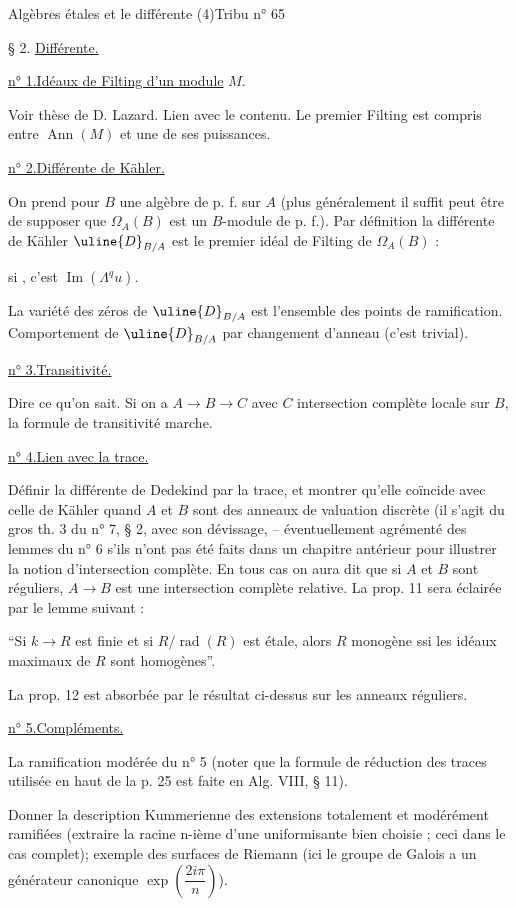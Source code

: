 
Algèbres étales et le différente (4)\hfill Tribu n° 65

§ 2. \uline{Différente.}

\uline{n° 1.}\quad \uline{Idéaux de Filting d'un module} $M$.

Voir thèse de D. Lazard. Lien avec le contenu. Le premier Filting est compris entre $\operatorname{Ann}(M)$ et une de ses puissances.

\uline{n° 2.}\quad \uline{Différente de Kähler.}

On prend pour $B$ une algèbre de \margin{\unsure{!}}p. f. sur $A$ (plus généralement il suffit peut être de supposer que $\Omega_A(B)$ est un $B$-module de p. f.). Par définition la différente de Kähler $\uline{D}_{B/A}$ est le premier idéal de Filting de $\Omega_A(B)$ :

si
, c'est $\operatorname{Im}(\Lambda^q u)$.

La variété des zéros de $\uline{D}_{B/A}$ est l'ensemble des points de ramification. Comportement de $\uline{D}_{B/A}$ par changement d'anneau (c'est trivial).

\uline{n° 3.}\quad \uline{Transitivité.}

Dire ce qu'on sait. Si on a $A\to B\to C$ avec $C$ intersection complète locale sur $B$, la formule de transitivité marche.

\uline{n° 4.}\quad \uline{Lien avec la trace.}

Définir la différente de Dedekind par la trace, et montrer qu'elle coïncide avec celle de Kähler quand $A$ et $B$ sont des anneaux de valuation discrète (il s'agit du gros th. 3 du n° 7, § 2, avec son dévissage, -- éventuellement agrémenté des lemmes du n° 6 s'ils n'ont pas été faits dans un chapitre antérieur pour illustrer la notion d'intersection complète. En tous cas on aura dit que si $A$ et $B$ sont réguliers, $A\to B$ est une intersection complète relative. La prop. 11 sera éclairée par le lemme suivant :

``Si $k\to R$ est finie et si $R/\operatorname{rad}(R)$ est étale, alors $R$ monogène ssi les idéaux maximaux de $R$ sont homogènes''.

La prop. 12 est absorbée par le résultat ci-dessus sur les anneaux réguliers.

\uline{n° 5.}\quad \uline{Compléments.}

La ramification modérée du n° 5 (noter que la formule de réduction des traces utilisée en haut de la p. 25 est faite en Alg. VIII, § 11).

Donner la description Kummerienne des extensions totalement et modérément ramifiées (extraire la racine n-ième d'une uniformisante bien choisie ; ceci dans le cas complet); exemple des surfaces de Riemann (ici le groupe de Galois a un générateur canonique $\exp\left(\dfrac{2i\pi}{n}\right)$).

